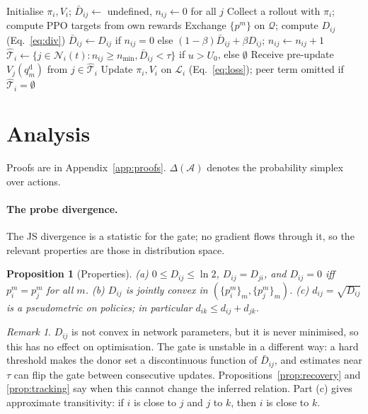 \documentclass{article}
\newtheorem{proposition}{Proposition}
\theoremstyle{remark}
\newtheorem{remark}{Remark}
\newcommand{\ours}{PGCT}
\begin{document}
\begin{algorithm}[t]
\caption{\ours{} for agent $i$}
\label{alg:pgct}
\begin{algorithmic}[1]
\State Initialise $\pi_i,V_i$; $\bar D_{ij}\gets$ undefined, $n_{ij}\gets 0$ for all $j$
  \State Collect a rollout with $\pi_i$; compute PPO targets from own rewards
      \State Exchange $\{p^m\}$ on $\mathcal{Q}$; compute $D_{ij}$ (Eq.~\ref{eq:div})
      \State $\bar D_{ij}\gets D_{ij}$ if $n_{ij}=0$ else $(1-\beta)\bar D_{ij}+\beta D_{ij}$; $n_{ij}\gets n_{ij}+1$
    \EndFor
  \EndIf
  \State $\hat{\mathcal{T}}_i\gets\{j\in\mathcal{N}_i(t):n_{ij}\ge n_{\min},\bar D_{ij}<\tau\}$ if $u>U_0$, else $\emptyset$
  \State Receive pre-update $V_j(q^{\mathrm{d}}_m)$ from $j\in\hat{\mathcal{T}}_i$
  \State Update $\pi_i,V_i$ on $\mathcal{L}_i$ (Eq.~\ref{eq:loss}); peer term omitted if $\hat{\mathcal{T}}_i=\emptyset$
\EndFor
\end{algorithmic}
\end{algorithm}

\section{Analysis}
\label{sec:analysis}
Proofs are in Appendix~\ref{app:proofs}. $\Delta(\mathcal{A})$ denotes the probability simplex over actions.

\paragraph{The probe divergence.} The JS divergence is a statistic for the gate; no gradient flows through it, so the
relevant properties are those in distribution space.
\begin{proposition}[Properties]
\label{prop:properties}
(a) $0\le D_{ij}\le\ln 2$, $D_{ij}=D_{ji}$, and $D_{ij}=0$ iff $p_i^m=p_j^m$ for all $m$.
(b) $D_{ij}$ is jointly convex in $(\{p_i^m\}_m,\{p_j^m\}_m)$.
(c) $d_{ij}=\sqrt{D_{ij}}$ is a pseudometric on policies; in particular $d_{ik}\le d_{ij}+d_{jk}$.
\end{proposition}
\begin{remark}
$D_{ij}$ is not convex in network parameters, but it is never minimised, so this has no effect on optimisation. The gate is
unstable in a different way: a hard threshold makes the donor set a discontinuous function of $\bar D_{ij}$, and estimates
near $\tau$ can flip the gate between consecutive updates. Propositions~\ref{prop:recovery} and \ref{prop:tracking} say when
this cannot change the inferred relation. Part (c) gives approximate transitivity: if $i$ is close to $j$ and $j$ to $k$, then
$i$ is close to $k$.
\end{remark}
\end{document}
